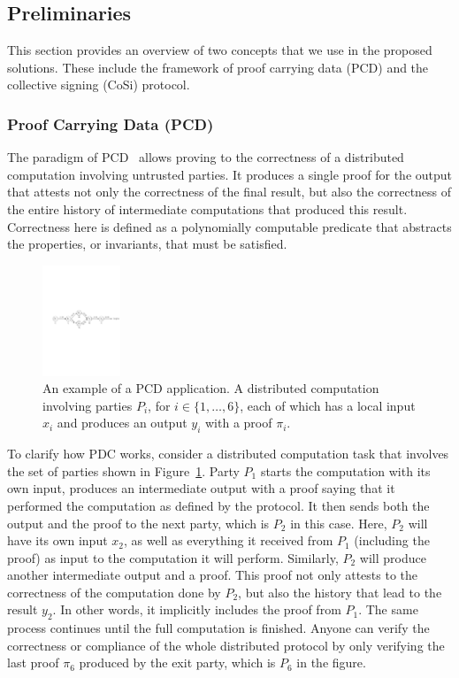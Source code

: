 \subsection{Preliminaries}
\label{prelim}
This section provides an overview of two concepts that we use in the 
proposed solutions. These include the framework of proof carrying data (PCD) 
and the collective signing (CoSi) protocol.


\subsubsection{Proof Carrying Data (PCD)}
The paradigm of PCD~\cite{chiesa2010proof} allows proving to the correctness of a distributed 
computation involving untrusted parties. It produces a single proof for the output 
that attests not only the correctness of the final result, but also 
the correctness of the entire history of intermediate computations that produced 
this result. Correctness here is defined as a polynomially computable predicate that 
abstracts the properties, or invariants, that must be satisfied.


\begin{figure}[h!]
\centerline{
\includegraphics[height= 1.3in, width = 1.0\columnwidth]{figures/pcd-diagram.pdf}}
\caption{An example of a PCD application. A distributed computation involving parties $P_i$, for 
$i \in \{1, \dots, 6\}$, each 
of which has a local input $x_i$ and produces an output $y_i$ with a proof $\pi_i$. }
\label{pcd-diagram}
\end{figure}


To clarify how PDC works, consider a distributed computation task that involves 
the set of parties shown in Figure~\ref{pcd-diagram}. Party $P_1$ starts the computation with its 
own input, produces an intermediate output with a proof saying that it performed 
the computation as defined by the protocol. It then sends both the output and the proof 
to the next party, which is $P_2$ in this case. Here, $P_2$ will 
have its own input $x_2$, as well as everything it received from $P_1$ (including the proof) 
as input to the computation it will perform. Similarly, $P_2$ will produce another 
intermediate output and a proof. This proof not only attests to the correctness of the 
computation done by $P_2$, but also the history that lead to the result $y_2$. In other 
words, it implicitly includes 
the proof from $P_1$. The same process continues until the full computation is finished. 
Anyone can verify the correctness or compliance of the whole distributed protocol by 
only verifying the last proof $\pi_6$ produced by the exit party, which is $P_6$ in the figure.


